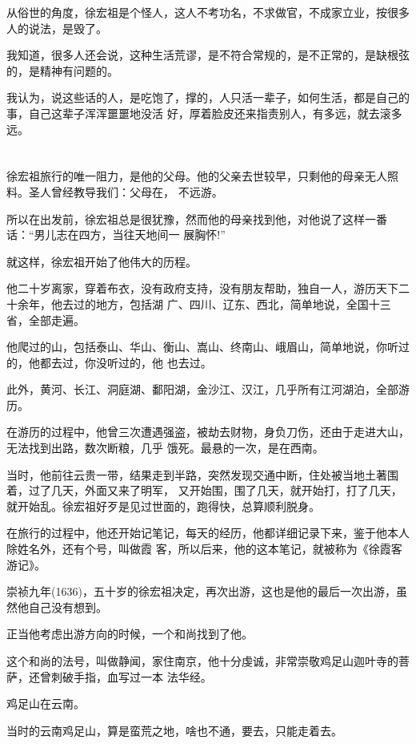 \documentclass[11pt,a4paper,onecolumn]{article}
\begin{document}
从俗世的角度，徐宏祖是个怪人，这人不考功名，不求做官，不成家立业，按很多人的说法，是毁了。

我知道，很多人还会说，这种生活荒谬，是不符合常规的，是不正常的，是缺根弦的，是精神有问题的。

我认为，说这些话的人，是吃饱了，撑的，人只活一辈子，如何生活，都是自己的事，自己这辈子浑浑噩噩地没活
好，厚着脸皮还来指责别人，有多远，就去滚多远。

\section[\thesection]{}

徐宏祖旅行的唯一阻力，是他的父母。他的父亲去世较早，只剩他的母亲无人照料。圣人曾经教导我们：父母在，
不远游。

所以在出发前，徐宏祖总是很犹豫，然而他的母亲找到他，对他说了这样一番话：``男儿志在四方，当往天地间一
展胸怀!''

就这样，徐宏祖开始了他伟大的历程。

他二十岁离家，穿着布衣，没有政府支持，没有朋友帮助，独自一人，游历天下二十余年，他去过的地方，包括湖
广、四川、辽东、西北，简单地说，全国十三省，全部走遍。

他爬过的山，包括泰山、华山、衡山、嵩山、终南山、峨眉山，简单地说，你听过的，他都去过，你没听过的，他
也去过。

此外，黄河、长江、洞庭湖、鄱阳湖，金沙江、汉江，几乎所有江河湖泊，全部游历。

在游历的过程中，他曾三次遭遇强盗，被劫去财物，身负刀伤，还由于走进大山，无法找到出路，数次断粮，几乎
饿死。最悬的一次，是在西南。

当时，他前往云贵一带，结果走到半路，突然发现交通中断，住处被当地土著围着，过了几天，外面又来了明军，
又开始围，围了几天，就开始打，打了几天，就开始乱。徐宏祖好歹是见过世面的，跑得快，总算顺利脱身。

在旅行的过程中，他还开始记笔记，每天的经历，他都详细记录下来，鉴于他本人除姓名外，还有个号，叫做霞
客，所以后来，他的这本笔记，就被称为《徐霞客游记》。

崇祯九年(1636)，五十岁的徐宏祖决定，再次出游，这也是他的最后一次出游，虽然他自己没有想到。

正当他考虑出游方向的时候，一个和尚找到了他。

这个和尚的法号，叫做静闻，家住南京，他十分虔诚，非常崇敬鸡足山迦叶寺的菩萨，还曾刺破手指，血写过一本
法华经。

鸡足山在云南。

当时的云南鸡足山，算是蛮荒之地，啥也不通，要去，只能走着去。
\end{document}
